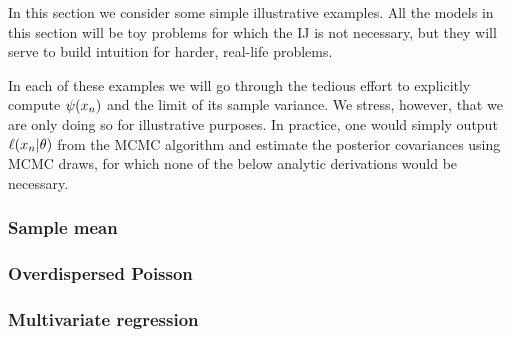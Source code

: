 In this section we consider some simple illustrative examples. All the
models in this section will be toy problems for which the IJ is not necessary,
but they will serve to build intuition for harder, real-life problems.

In each of these examples we will go through the tedious effort to explicitly
compute $\psi(x_n)$ and the limit of its sample variance.  We stress, however,
that we are only doing so for illustrative purposes.  In practice, one would
simply output $\ell(x_n \vert \theta)$ from the MCMC algorithm and estimate the
posterior covariances using MCMC draws, for which none of the below analytic
derivations would be necessary.


\subsubsection{Sample mean}



\subsubsection{Overdispersed Poisson}


\subsubsection{Multivariate regression}

